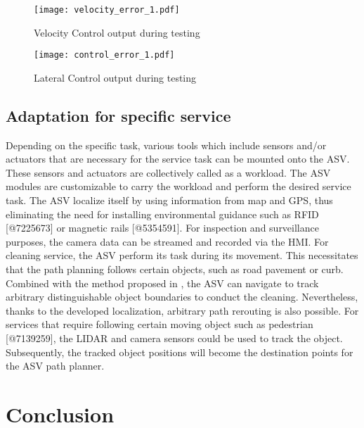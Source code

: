 \documentclass[10 pt,a4paper,conference]{IEEEtran}
\begin{document}
\begin{figure}[!t]
\centering
\texttt{[image: velocity\_error\_1.pdf]}
\caption{Velocity Control output during testing }
\label{vel_error_test}
\end{figure}

\begin{figure}[!t]
\centering
\texttt{[image: control\_error\_1.pdf]}
\caption{Lateral Control output during testing }
\label{control_error_test}
\end{figure}

\subsection{Adaptation for specific
service}\label{adaptation-for-specific-service}

Depending on the specific task, various tools which include sensors
and/or actuators that are necessary for the service task can be mounted
onto the ASV. These sensors and actuators are collectively called as a
workload. The ASV modules are customizable to carry the workload and
perform the desired service task. The ASV localize itself by using
information from map and GPS, thus eliminating the need for installing
environmental guidance such as RFID {[}@7225673{]} or magnetic rails
{[}@5354591{]}. For inspection and surveillance purposes, the camera
data can be streamed and recorded via the HMI. For cleaning service, the
ASV perform its task during its movement. This necessitates that the
path planning follows certain objects, such as road pavement or curb.
Combined with the method proposed in \citep{SongZW_IV_2015}, the ASV can
navigate to track arbitrary distinguishable object boundaries to conduct
the cleaning. Nevertheless, thanks to the developed localization,
arbitrary path rerouting is also possible. For services that require
following certain moving object such as pedestrian {[}@7139259{]}, the
LIDAR and camera sensors could be used to track the object.
Subsequently, the tracked object positions will become the destination
points for the ASV path planner.

\section{Conclusion}\label{conclusion}
\end{document}
